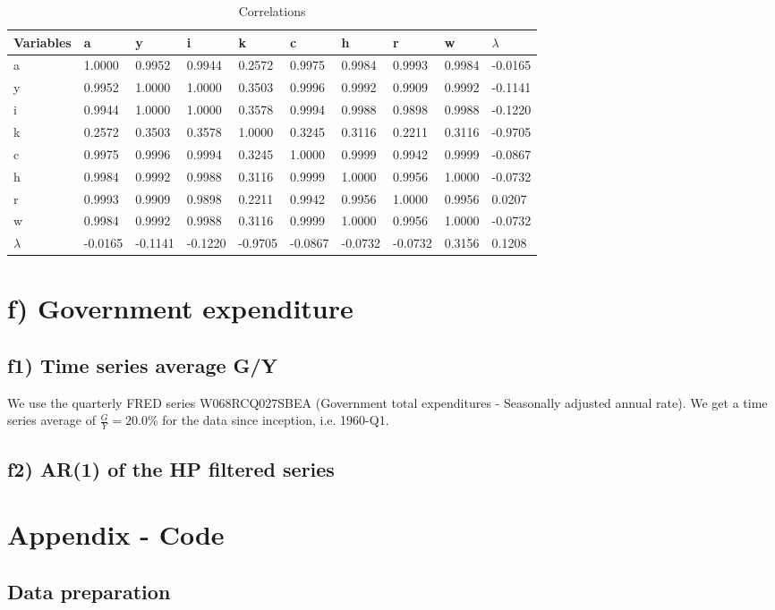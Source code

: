 \documentclass[10pt,letter]{article}
\begin{document}
\begin{table}[]
	\begin{tabular}{l|lllllllll}
		Variables & a       & y       & i       & k       & c       & h       & r       & w      & $\lambda$  \\\hline
		a         & 1.0000  & 0.9952  & 0.9944  & 0.2572  & 0.9975  & 0.9984  & 0.9993  & 0.9984 & -0.0165 \\
		y         & 0.9952  & 1.0000  & 1.0000  & 0.3503  & 0.9996  & 0.9992  & 0.9909  & 0.9992 & -0.1141 \\
		i         & 0.9944  & 1.0000  & 1.0000  & 0.3578  & 0.9994  & 0.9988  & 0.9898  & 0.9988 & -0.1220 \\
		k         & 0.2572  & 0.3503  & 0.3578  & 1.0000  & 0.3245  & 0.3116  & 0.2211  & 0.3116 & -0.9705 \\
		c         & 0.9975  & 0.9996  & 0.9994  & 0.3245  & 1.0000  & 0.9999  & 0.9942  & 0.9999 & -0.0867 \\
		h         & 0.9984  & 0.9992  & 0.9988  & 0.3116  & 0.9999  & 1.0000  & 0.9956  & 1.0000 & -0.0732 \\
		r         & 0.9993  & 0.9909  & 0.9898  & 0.2211  & 0.9942  & 0.9956  & 1.0000  & 0.9956 & 0.0207  \\
		w         & 0.9984  & 0.9992  & 0.9988  & 0.3116  & 0.9999  & 1.0000  & 0.9956  & 1.0000 & -0.0732 \\
		$\lambda$    & -0.0165 & -0.1141 & -0.1220 & -0.9705 & -0.0867 & -0.0732 & -0.0732 & 0.3156 & 0.1208 
	\end{tabular}
\caption{Correlations}
\end{table}
\section*{f) Government expenditure} \label{c2}

\subsection*{f1) Time series average G/Y}
We use the quarterly FRED series W068RCQ027SBEA (Government total expenditures - Seasonally adjusted annual rate). We get a time series average of $\frac{G}{Y} = 20.0\%$ for the data since inception, i.e. 1960-Q1.

\subsection*{f2) AR(1) of the HP filtered series}





\section*{Appendix - Code}
\subsection*{Data preparation}
%
\end{document}
